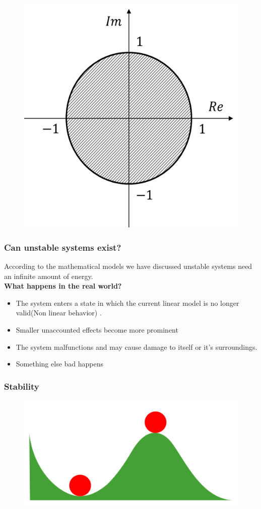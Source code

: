 \begin{frame}
\begin{figure}
\centering
\includegraphics[height=0.7\textheight]{Images/discrete_time_systems_27}
\label{fig:discrete_time_systems_27}
\end{figure}
\end{frame}
\begin{frame}
	\frametitle{Can unstable systems exist?}
	According to the mathematical models we have discussed unstable systems need an infinite amount of energy.\\
	\textbf{What happens in the real world?}
	\begin{itemize}
		\item The system enters a state in which the current linear model is no longer valid(Non linear behavior) .
		\item Smaller unaccounted effects become more prominent
		\item The system malfunctions and may cause damage to itself or it’s surroundings.
		\item Something else bad happens
	\end{itemize}
\end{frame}
\begin{frame}
	\frametitle{Stability}
	\begin{figure}
	\centering
	\includegraphics[width=0.7\linewidth]{Images/discrete_time_systems_29}
	\label{fig:discrete_time_systems_29}
	\end{figure}

\end{frame}
